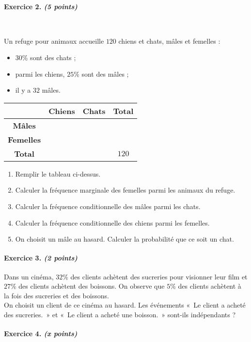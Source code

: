 \documentclass[11pt]{article}
\begin{document}
\paragraph{Exercice 2. \emph{(5 points)}}~\\
\begin{minipage}[]{.5\textwidth}
Un refuge pour animaux accueille $120$ chiens et chats, m\^ales et femelles :
\begin{itemize}
  \item $30$\% sont des chats ;
  \item parmi les chiens, $25$\% sont des m\^ales ;
  \item il y a $32$ m\^ales.
\end{itemize}
\end{minipage}
\begin{minipage}[]{.5\textwidth}
\begin{center}
\renewcommand{\arraystretch}{2}
\begin{tabular}{|c|c|c|c|}
  \cline{2-4}
  \multicolumn{1}{c|}{} & \textbf{Chiens} & \textbf{Chats} & \textbf{Total} \\ 
  \hline
  \textbf{M\^ales} & & & \\
  \hline
  \textbf{Femelles} & & & \\
  \hline
  \textbf{Total} & & & $120$ \\
  \hline
\end{tabular}
\end{center}
\end{minipage}
\begin{enumerate}
  \item Remplir le tableau ci-dessus.
  \item Calculer la fréquence marginale des femelles parmi les animaux du
    refuge.
  \item Calculer la fréquence conditionnelle des m\^ales parmi les chats.
  \item Calculer la fréquence conditionnelle des chiens parmi les femelles.
  \item On choisit un m\^ale au hasard. Calculer la probabilité que ce soit un
    chat.
\end{enumerate}

\paragraph{Exercice 3. \emph{(2 points)}}
Dans un cinéma, $32$\% des clients achètent des sucreries pour visionner leur
film et $27$\% des clients achètent des boissons. On observe que $5$\% des
clients achètent à la fois des sucreries et des boissons.\\
On choisit un client de ce cinéma au hasard. Les événements «~Le client a acheté
des sucreries.~» et «~Le client a acheté une boisson.~» sont-ils indépendants ?

\paragraph{Exercice 4. \emph{(x points)}} %
\end{document}
